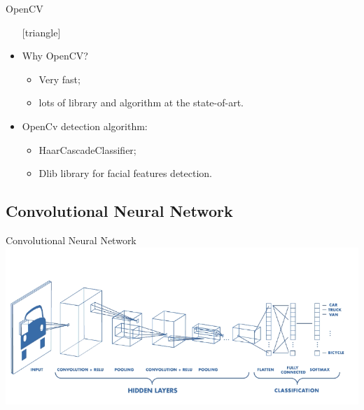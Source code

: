 \documentclass{beamer}
\begin{document}
\begin{frame}{OpenCV}
	\begin{itemize}
		\setlength\itemsep{1em}
		[triangle]
		\item
			Why OpenCV?
			\begin{itemize}
				[circle]
				\item 
					Very fast;
				\item 
					lots of library and algorithm at the state-of-art.
			\end{itemize}
		\item 
			OpenCv detection algorithm:
			\begin{itemize}
				[circle]
				\item 
					HaarCascadeClassifier;
				\item 
					Dlib library for facial features detection.
			\end{itemize}
	\end{itemize}
\end{frame}




\subsection{Convolutional Neural Network}

\begin{frame}{Convolutional Neural Network}
	\includegraphics[scale=0.45]{CNN}
\end{frame}
\end{document}
